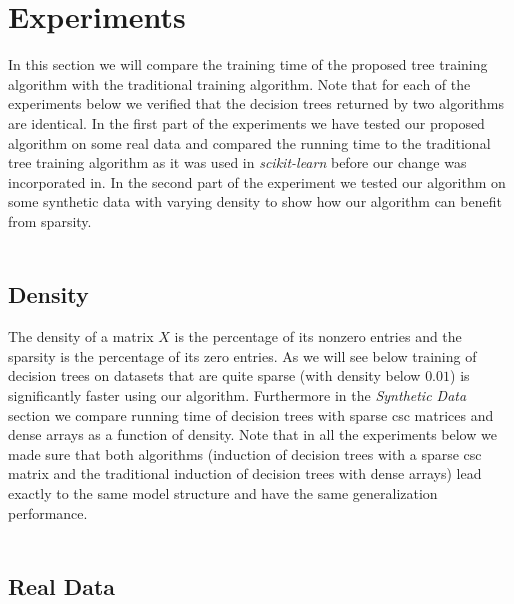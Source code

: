 \section{Experiments} \label{sec:experiments}

In this section we will compare the training time of the proposed tree training algorithm with the traditional training algorithm. Note that for each of the experiments below we verified that the decision trees returned by two algorithms are identical. In the first part of the experiments we have tested our proposed algorithm on some real data and compared the running time to the traditional tree training algorithm as it was used in \emph{scikit-learn} before our change was incorporated in. In the second part of the experiment we tested our algorithm on some synthetic data with varying density to show how our algorithm can benefit from sparsity. \\\\%

\subsection{Density}
The density of a matrix $X$ is the percentage of its nonzero entries and the sparsity is the percentage of its zero entries. As we will see below training of decision trees on datasets that are quite sparse (with density below $0.01$) is significantly faster using our algorithm. Furthermore in the \emph{Synthetic Data} section we compare running time of decision trees with sparse csc matrices and dense arrays as a function of density. Note that in all the experiments below we made sure that both algorithms (induction of decision trees with a sparse csc matrix and the traditional induction of decision trees with dense arrays) lead exactly to the same model structure and have the same generalization performance.\\\\

\subsection{Real Data}

